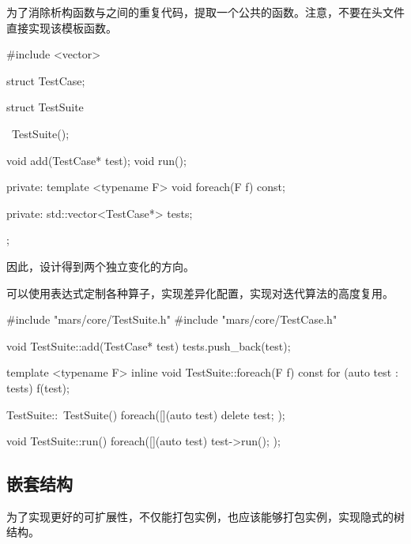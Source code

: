 \begin{content}
为了消除析构函数与之间的重复代码，提取一个公共的函数。注意，不要在头文件直接实现该模板函数。

\begin{leftbar}
 \begin{c++}[caption={\ttfamily{include/mars/core/TestSuite.h}}]
#include <vector>

struct TestCase;

struct TestSuite {
  ~TestSuite();

  void add(TestCase* test);
  void run();

private:
  template <typename F>
  void foreach(F f) const;

private:
  std::vector<TestCase*> tests;
};
 \end{c++}
\end{leftbar}

因此，设计得到两个独立变化的方向。

\begin{enum}
\end{enum}

可以使用表达式定制各种算子，实现差异化配置，实现对迭代算法的高度复用。

\begin{leftbar}
 \begin{c++}[caption={\ttfamily{src/mars/core/TestSuite.cc}}]
#include "mars/core/TestSuite.h"
#include "mars/core/TestCase.h"

void TestSuite::add(TestCase* test) {
  tests.push_back(test);
}

template <typename F>
inline void TestSuite::foreach(F f) const {
  for (auto test : tests) {
    f(test);
  }
}

TestSuite::~TestSuite() {
  foreach([](auto test) {
    delete test;
  });
}

void TestSuite::run() {
  foreach([](auto test) {
    test->run();
  });
}
 \end{c++}
\end{leftbar}

\subsection{嵌套结构}

为了实现更好的可扩展性，不仅能打包实例，也应该能够打包实例，实现隐式的树结构。


\end{content}
